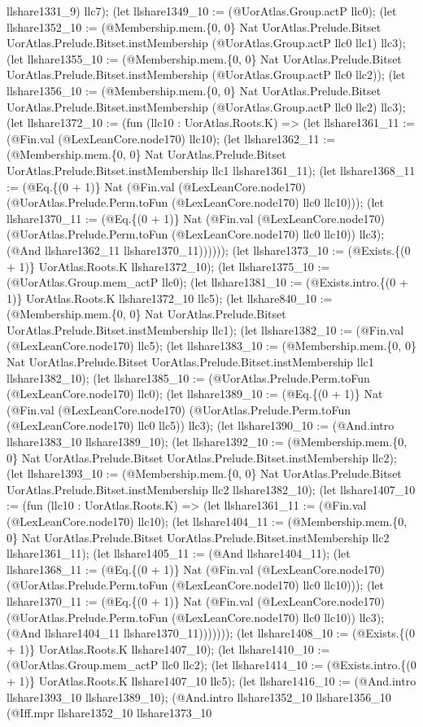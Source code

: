 \documentclass[11pt]{article}
\begin{document}
llshare1331\_9) llc7); (let llshare1349\_10 := (@UorAtlas.Group.actP llc0); (let llshare1352\_10 := (@Membership.mem.\{0, 0\} Nat UorAtlas.Prelude.Bitset UorAtlas.Prelude.Bitset.instMembership (@UorAtlas.Group.actP llc0 llc1) llc3); (let llshare1355\_10 := (@Membership.mem.\{0, 0\} Nat UorAtlas.Prelude.Bitset UorAtlas.Prelude.Bitset.instMembership (@UorAtlas.Group.actP llc0 llc2)); (let llshare1356\_10 := (@Membership.mem.\{0, 0\} Nat UorAtlas.Prelude.Bitset UorAtlas.Prelude.Bitset.instMembership (@UorAtlas.Group.actP llc0 llc2) llc3); (let llshare1372\_10 := (fun (llc10 : UorAtlas.Roots.K) => (let llshare1361\_11 := (@Fin.val (@LexLeanCore.node170) llc10); (let llshare1362\_11 := (@Membership.mem.\{0, 0\} Nat UorAtlas.Prelude.Bitset UorAtlas.Prelude.Bitset.instMembership llc1 llshare1361\_11); (let llshare1368\_11 := (@Eq.\{(0 + 1)\} Nat (@Fin.val (@LexLeanCore.node170) (@UorAtlas.Prelude.Perm.toFun (@LexLeanCore.node170) llc0 llc10))); (let llshare1370\_11 := (@Eq.\{(0 + 1)\} Nat (@Fin.val (@LexLeanCore.node170) (@UorAtlas.Prelude.Perm.toFun (@LexLeanCore.node170) llc0 llc10)) llc3); (@And llshare1362\_11 llshare1370\_11)))))); (let llshare1373\_10 := (@Exists.\{(0 + 1)\} UorAtlas.Roots.K llshare1372\_10); (let llshare1375\_10 := (@UorAtlas.Group.mem\_actP llc0); (let llshare1381\_10 := (@Exists.intro.\{(0 + 1)\} UorAtlas.Roots.K llshare1372\_10 llc5); (let llshare840\_10 := (@Membership.mem.\{0, 0\} Nat UorAtlas.Prelude.Bitset UorAtlas.Prelude.Bitset.instMembership llc1); (let llshare1382\_10 := (@Fin.val (@LexLeanCore.node170) llc5); (let llshare1383\_10 := (@Membership.mem.\{0, 0\} Nat UorAtlas.Prelude.Bitset UorAtlas.Prelude.Bitset.instMembership llc1 llshare1382\_10); (let llshare1385\_10 := (@UorAtlas.Prelude.Perm.toFun (@LexLeanCore.node170) llc0); (let llshare1389\_10 := (@Eq.\{(0 + 1)\} Nat (@Fin.val (@LexLeanCore.node170) (@UorAtlas.Prelude.Perm.toFun (@LexLeanCore.node170) llc0 llc5)) llc3); (let llshare1390\_10 := (@And.intro llshare1383\_10 llshare1389\_10); (let llshare1392\_10 := (@Membership.mem.\{0, 0\} Nat UorAtlas.Prelude.Bitset UorAtlas.Prelude.Bitset.instMembership llc2); (let llshare1393\_10 := (@Membership.mem.\{0, 0\} Nat UorAtlas.Prelude.Bitset UorAtlas.Prelude.Bitset.instMembership llc2 llshare1382\_10); (let llshare1407\_10 := (fun (llc10 : UorAtlas.Roots.K) => (let llshare1361\_11 := (@Fin.val (@LexLeanCore.node170) llc10); (let llshare1404\_11 := (@Membership.mem.\{0, 0\} Nat UorAtlas.Prelude.Bitset UorAtlas.Prelude.Bitset.instMembership llc2 llshare1361\_11); (let llshare1405\_11 := (@And llshare1404\_11); (let llshare1368\_11 := (@Eq.\{(0 + 1)\} Nat (@Fin.val (@LexLeanCore.node170) (@UorAtlas.Prelude.Perm.toFun (@LexLeanCore.node170) llc0 llc10))); (let llshare1370\_11 := (@Eq.\{(0 + 1)\} Nat (@Fin.val (@LexLeanCore.node170) (@UorAtlas.Prelude.Perm.toFun (@LexLeanCore.node170) llc0 llc10)) llc3); (@And llshare1404\_11 llshare1370\_11))))))); (let llshare1408\_10 := (@Exists.\{(0 + 1)\} UorAtlas.Roots.K llshare1407\_10); (let llshare1410\_10 := (@UorAtlas.Group.mem\_actP llc0 llc2); (let llshare1414\_10 := (@Exists.intro.\{(0 + 1)\} UorAtlas.Roots.K llshare1407\_10 llc5); (let llshare1416\_10 := (@And.intro llshare1393\_10 llshare1389\_10); (@And.intro llshare1352\_10 llshare1356\_10 (@Iff.mpr llshare1352\_10 llshare1373\_10 
\end{document}
